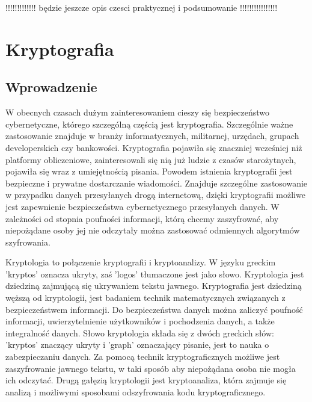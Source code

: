 \documentclass[12p]{article}
\begin{document}
 

!!!!!!!!!!!!! będzie jeszcze opis czesci praktycznej i podsumowanie !!!!!!!!!!!!!!!!

\newpage
\section{Kryptografia}
\subsection{Wprowadzenie}

\quad W obecnych czasach dużym zainteresowaniem cieszy się bezpieczeństwo cybernetyczne, którego szczególną częścią jest kryptografia. Szczególnie ważne zastosowanie znajduje w branży informatycznych, militarnej, urzędach, grupach developerskich czy bankowości. Kryptografia pojawiła się znaczniej wcześniej niż platformy obliczeniowe, zainteresowali się nią już ludzie z czasów starożytnych, pojawiła się wraz z umiejętnością pisania. Powodem istnienia kryptografii jest bezpieczne i prywatne dostarczanie wiadomości. Znajduje szczególne zastosowanie w przypadku danych przesyłanych drogą internetową, dzięki kryptografii możliwe jest zapewnienie bezpieczeństwa cybernetycznego przesyłanych danych. W zależności od stopnia poufności informacji, którą chcemy zaszyfrować, aby niepożądane osoby jej nie odczytały można zastosować odmiennych algorytmów szyfrowania. 

\quad Kryptologia to połączenie kryptografii i kryptoanalizy. W języku greckim 'kryptos' oznacza ukryty, zaś 'logos' tłumaczone jest jako słowo. Kryptologia jest dziedziną zajmującą się ukrywaniem tekstu jawnego. Kryptografia jest dziedziną węższą od kryptologii, jest badaniem technik matematycznych związanych z bezpieczeństwem informacji. Do bezpieczeństwa danych można zaliczyć poufność informacji, uwierzytelnienie użytkowników i pochodzenia danych, a także integralność danych. Słowo kryptologia składa się z dwóch greckich słów: 'kryptos' znaczący ukryty i 'graph' oznaczający pisanie, jest to nauka o zabezpieczaniu danych. Za pomocą technik kryptograficznych możliwe jest zaszyfrowanie jawnego tekstu, w taki sposób aby niepożądana osoba nie mogła ich odczytać. Drugą gałęzią kryptologii jest kryptoanaliza, która zajmuje się analizą i możliwymi sposobami odszyfrowania kodu kryptograficznego.
\end{document}
